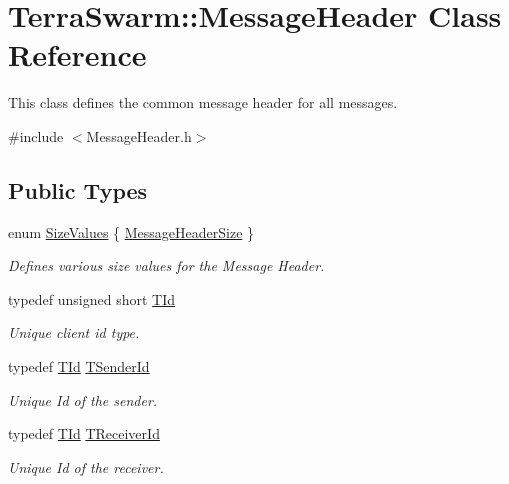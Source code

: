 \hypertarget{class_terra_swarm_1_1_message_header}{\section{Terra\-Swarm\-:\-:Message\-Header Class Reference}
\label{class_terra_swarm_1_1_message_header}
}


This class defines the common message header for all messages.  




{\ttfamily \#include $<$Message\-Header.\-h$>$}

\subsection*{Public Types}
\begin{DoxyCompactItemize}
\item 
enum \hyperlink{class_terra_swarm_1_1_message_header_aa1066aaf03d8443ecda7e4c9b8e60fce}{Size\-Values} \{ \hyperlink{class_terra_swarm_1_1_message_header_aa1066aaf03d8443ecda7e4c9b8e60fcea421e8aff7e21d86fb408624a2963e8b9}{Message\-Header\-Size}
 \}
\begin{DoxyCompactList}\small\item\em Defines various size values for the Message Header. \end{DoxyCompactList}\item 
typedef unsigned short \hyperlink{class_terra_swarm_1_1_message_header_ab55de822fadad758edcd8f36bd07676e}{T\-Id}
\begin{DoxyCompactList}\small\item\em Unique client id type. \end{DoxyCompactList}\item 
typedef \hyperlink{class_terra_swarm_1_1_message_header_ab55de822fadad758edcd8f36bd07676e}{T\-Id} \hyperlink{class_terra_swarm_1_1_message_header_a516b36855e2aad7cfbf8770f1b42784f}{T\-Sender\-Id}
\begin{DoxyCompactList}\small\item\em Unique Id of the sender. \end{DoxyCompactList}\item 
typedef \hyperlink{class_terra_swarm_1_1_message_header_ab55de822fadad758edcd8f36bd07676e}{T\-Id} \hyperlink{class_terra_swarm_1_1_message_header_aa3260702b182b6f88ddbdd3416e98df0}{T\-Receiver\-Id}
\begin{DoxyCompactList}\small\item\em Unique Id of the receiver. \end{DoxyCompactList}\item 

\end{DoxyCompactItemize}
